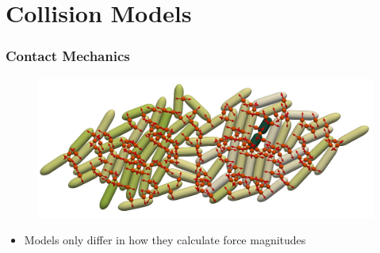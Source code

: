 \documentclass[10pt,t]{beamer}
\begin{document}

\section{Collision Models}


\begin{frame}
    \frametitle{Contact Mechanics}

    \begin{figure}
        \centering
        \includegraphics[width=1\textwidth]{figures/constraints.jpeg}
    \end{figure}


    \begin{itemize}
        \item Models only differ in how they calculate force magnitudes
    \end{itemize}

\end{frame}
\end{document}
